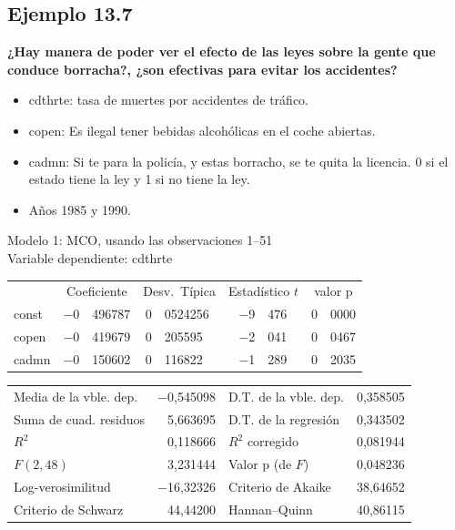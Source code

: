 \subsection{Ejemplo 13.7}
\textbf{¿Hay manera de poder ver el efecto de las leyes sobre la gente que conduce borracha?, ¿son efectivas para evitar los accidentes?}\\

\begin{itemize}
    \item cdthrte: tasa de muertes por accidentes de tráfico.
    \item copen: Es ilegal tener bebidas alcohólicas en el coche abiertas.
    \item cadmn: Si te para la policía, y estas borracho, se te quita la licencia. 0 si el estado tiene la ley y 1 si no tiene la ley.
    \item Años 1985 y 1990.
\end{itemize}



\begin{center}

Modelo 1: MCO, usando las observaciones 1--51\\
Variable dependiente: cdthrte\\

\vspace{1em}

\begin{tabular}{lr@{,}lr@{,}lr@{,}lr@{,}l}
  &
 \multicolumn{2}{c}{Coeficiente} &
  \multicolumn{2}{c}{Desv.\ Típica} &
   \multicolumn{2}{c}{Estadístico $t$} &
    \multicolumn{2}{c}{valor p} \\[1ex]
const &
  $-$0&496787 &
    0&0524256 &
      $-$9&476 &
        0&0000 \\
copen &
  $-$0&419679 &
    0&205595 &
      $-$2&041 &
        0&0467 \\
cadmn &
  $-$0&150602 &
    0&116822 &
      $-$1&289 &
        0&2035 \\
\end{tabular}

\vspace{1ex}
\begin{tabular}{lrlr}
Media de la vble. dep. & $-$0,545098 & D.T. de la vble. dep. &  0,358505 \\
Suma de cuad. residuos &  5,663695 & D.T. de la regresión &  0,343502 \\
$R^2$ &  0,118666 & $R^2$ corregido &  0,081944 \\
$F(2, 48)$ &  3,231444 & Valor p (de $F$) &  0,048236 \\
Log-verosimilitud & $-$16,32326 & Criterio de Akaike &  38,64652 \\
Criterio de Schwarz &  44,44200 & Hannan--Quinn &  40,86115 \\
\end{tabular}


\end{center}

